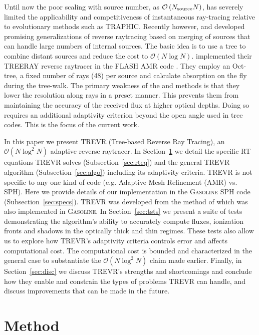 \documentclass[fleq,usenatbib]{mnras}
\newcommand{\acro}{TREVR}
\newcommand{\bigO}[1]{\mathcal{O}\left(#1\right)}
\newcommand{\NS}{N_{\rm source}}
\begin{document}
{Until now the poor scaling with source number, as $\bigO{\NS N}$,
has severely limited the applicability and competitiveness
of instantaneous ray-tracing relative to evolutionary methods such as TRAPHIC.
Recently however, \cite{Woods2015} and \cite{HaidEt18} developed promising generalizations
of reverse raytracing based on merging of sources that can handle large numbers of internal sources.
The basic idea is to
use a tree to combine distant sources and reduce the cost to $\bigO{N \log N}$.
\cite{HaidEt18} implemented their TREERAY reverse raytracer in the FLASH AMR code \citep{FryxellEt2000}.
They employ an Oct-tree, a fixed number of rays (48) per source and calculate absorption on
the fly during the tree-walk.  The primary weakness of the \cite{Woods2015} and \cite{HaidEt18}
methods is that they lower the resolution along rays in a preset manner.  This prevents
them from maintaining the accuracy of the received flux at higher optical depths.
Doing so requires an additional adaptivity criterion beyond the open angle used in tree codes.
This is the focus of the current work.

In this paper we present \acro{} (Tree-based Reverse Ray Tracing),
an $\bigO{N \log^2 N}$ adaptive reverse raytracer.  
In Section~\ref{sec:mthd} we detail 
the specific RT equations \acro{} solves (Subsection~\ref{sec:rteq}) and the 
general \acro{} algorithm (Subsection~\ref{sec:algo}) including its adaptivity criteria.
\acro{} is not specific
to any one kind of code (e.g. Adaptive Mesh Refinement (AMR) vs. SPH).
Here we provide details of 
our implementation in the \textsc{Gasoline} SPH code (Subsection~\ref{sec:specs}).
\acro{} was developed from the method of \cite{Woods2015} which was also 
implemented in \textsc{Gasoline}.
In Section~\ref{sec:tsts} we present a suite of tests demonstrating the 
algorithm's ability to accurately compute fluxes, ionization fronts and 
shadows in the optically thick and thin regimes. These tests also allow us to 
explore how \acro{}'s adaptivity criteria controls error and affects 
computational cost. The computational cost is bounded and characterized in the
general case to substantiate the $\bigO{N \log^2 N}$ claim made earlier. 
Finally, in Section~\ref{sec:disc} we discuss \acro{}'s strengths and 
shortcomings and conclude how they enable and constrain the types of problems 
\acro{} can handle, and discuss improvements that can be made in the future.

\section{Method}\label{sec:mthd}
}
\end{document}
